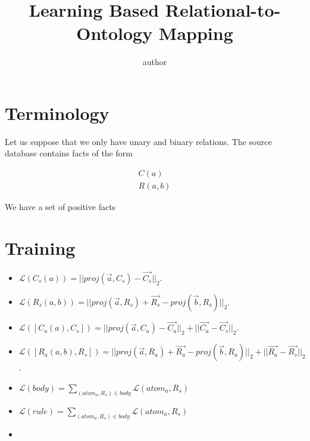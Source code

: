 \documentclass{easychair}
\title{Learning Based Relational-to-Ontology Mapping}
\newcommand{\p}{proj}
\newcommand{\body}{body}
\newcommand{\atom}{atom}
\newcommand{\rule}{rule}
\begin{document}
\author{
  author
}



\maketitle

\section{Terminology}

Let us suppose that we only have unary and binary relations. The
source database contains facts of the form

\begin{align}
  C(a) \\
  R(a, b)
\end{align}

We have a set of positive facts


\section{Training}

\begin{itemize}
\item $\mathcal{L}(C_s(a)) = ||\p(\vec{a},C_s) - \vec{C_s}||_2$.
\item $\mathcal{L}(R_s(a,b)) = ||\p(\vec{a},R_s) + \vec{R_s} - \p(\vec{b},R_s)||_2$.
\item $\mathcal{L}([C_a(a), C_s]) = ||\p(\vec{a},C_a) - \vec{C_a}||_2 + ||\vec{C_a} - \vec{C_s}||_2$.
\item $\mathcal{L}([R_a(a,b), R_s]) = ||\p(\vec{a},R_a) + \vec{R_a} - \p(\vec{b},R_a)||_2 + ||\vec{R_a} - \vec{R_s}||_2$.
\item $\mathcal{L}(\body) = \sum_{(\atom_a, R_s) \in \body} \mathcal{L}(\atom_a, R_s)$
\item $\mathcal{L}(\rule) = \sum_{(\atom_a, R_s) \in \body} \mathcal{L}(\atom_a, R_s)$
\item

\end{itemize}
\end{document}
